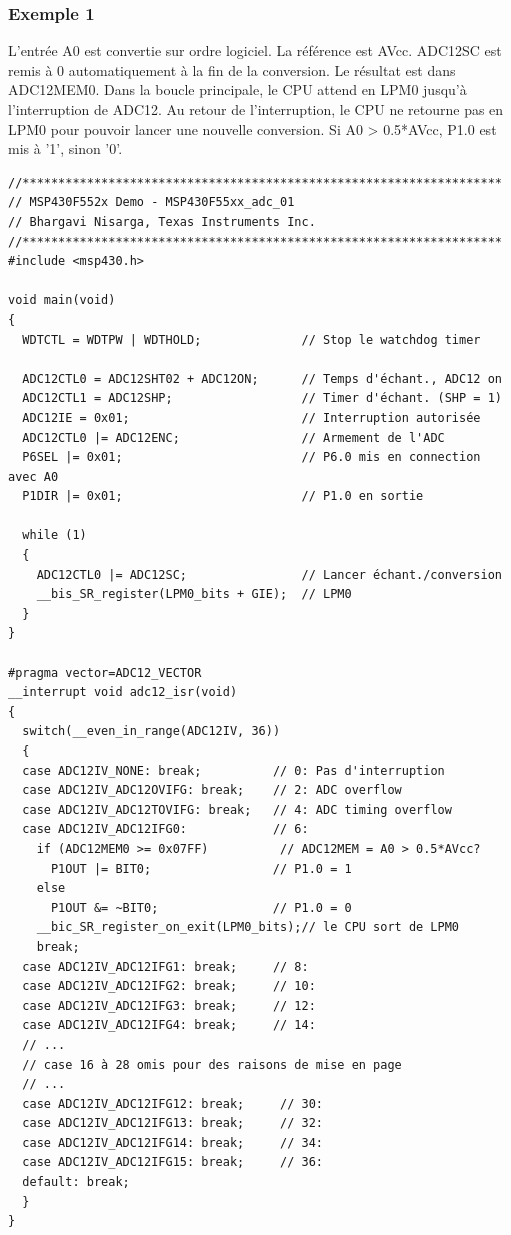 \begin{minipage}{16cm}{
\subsubsection*{Exemple 1}
L'entrée A0 est convertie sur ordre logiciel. La référence est AVcc. ADC12SC est remis à 0 automatiquement à la fin de la conversion. Le résultat est dans ADC12MEM0. Dans la boucle principale, le CPU attend en LPM0 jusqu'à l'interruption de ADC12. Au retour de l'interruption, le CPU ne retourne pas en LPM0 pour pouvoir lancer une nouvelle conversion. Si A0 > 0.5*AVcc, P1.0 est mis à '1', sinon '0'.

\lstset{style=customc}
\begin{lstlisting}
//*******************************************************************
// MSP430F552x Demo - MSP430F55xx_adc_01
// Bhargavi Nisarga, Texas Instruments Inc.
//*******************************************************************
#include <msp430.h>

void main(void)
{
  WDTCTL = WDTPW | WDTHOLD;              // Stop le watchdog timer

  ADC12CTL0 = ADC12SHT02 + ADC12ON;      // Temps d'échant., ADC12 on
  ADC12CTL1 = ADC12SHP;                  // Timer d'échant. (SHP = 1)
  ADC12IE = 0x01;                        // Interruption autorisée
  ADC12CTL0 |= ADC12ENC;                 // Armement de l'ADC
  P6SEL |= 0x01;                         // P6.0 mis en connection avec A0
  P1DIR |= 0x01;                         // P1.0 en sortie

  while (1)
  {
    ADC12CTL0 |= ADC12SC;                // Lancer échant./conversion
    __bis_SR_register(LPM0_bits + GIE);  // LPM0
  }
}

#pragma vector=ADC12_VECTOR
__interrupt void adc12_isr(void)
{
  switch(__even_in_range(ADC12IV, 36))
  {
  case ADC12IV_NONE: break;          // 0: Pas d'interruption
  case ADC12IV_ADC12OVIFG: break;    // 2: ADC overflow
  case ADC12IV_ADC12TOVIFG: break;   // 4: ADC timing overflow
  case ADC12IV_ADC12IFG0:            // 6: 
    if (ADC12MEM0 >= 0x07FF)          // ADC12MEM = A0 > 0.5*AVcc?
      P1OUT |= BIT0;                 // P1.0 = 1
    else
      P1OUT &= ~BIT0;                // P1.0 = 0
    __bic_SR_register_on_exit(LPM0_bits);// le CPU sort de LPM0
    break;
  case ADC12IV_ADC12IFG1: break;     // 8: 
  case ADC12IV_ADC12IFG2: break;     // 10:
  case ADC12IV_ADC12IFG3: break;     // 12:
  case ADC12IV_ADC12IFG4: break;     // 14:
  // ...
  // case 16 à 28 omis pour des raisons de mise en page
  // ...
  case ADC12IV_ADC12IFG12: break;     // 30: 
  case ADC12IV_ADC12IFG13: break;     // 32: 
  case ADC12IV_ADC12IFG14: break;     // 34:
  case ADC12IV_ADC12IFG15: break;     // 36:
  default: break; 
  }
}
\end{lstlisting}
}
\end{minipage}

